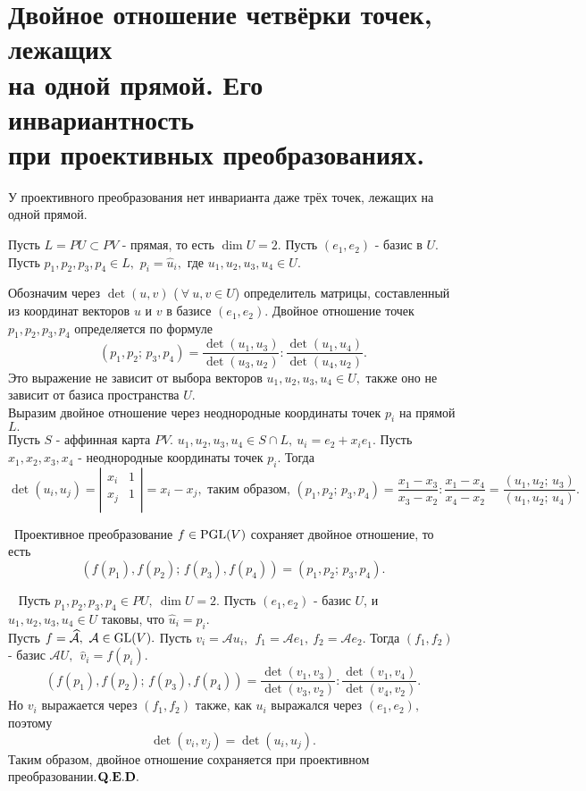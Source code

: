 \documentclass[a4paper]{article}%
\renewcommand{\ab}{\par\noindent}%
\newcommand{\te}{\par\noindent{\bf Теорема.}\ }%
\newcommand{\dok}{\par\noindent{\textsl{Доказательство}.}\ }%
\newcommand{\qed}{\quad${{\bf Q.E.D.}}$}
\renewcommand{\om}[1]{\mathcal{#1}}
\newcommand{\we}[1]{\widehat{#1}}
\begin{document}
\section{Двойное отношение четвёрки точек, лежащих\\ на одной прямой. Его инвариантность\\ при проективных преобразованиях.}
\label{q54}
У проективного преобразования нет инварианта даже трёх точек, лежащих на одной прямой.
\ab Пусть $L=PU\subset PV$ - прямая, то есть\; $\dim U=2.$
Пусть $(e_1,e_2)$ - базис в $U$. Пусть $p_1,p_2,p_3,p_4\in L,$ $p_i=\we{u}_i,$ где $u_1,u_2,u_3,u_4\in U.$
\ab Обозначим через $\det(u,v)$ ($\ \forall \ u,v\in U$) определитель матрицы, составленный из координат векторов
$u$ и $v$ в базисе $(e_1,e_2).$ Двойное отношение точек $p_1,p_2,p_3,p_4$ определяется по формуле
$$
(p_1,p_2;\,p_3,p_4)=\frac{\displaystyle \det(u_1,u_3)}{\displaystyle \det(u_3,u_2)}:\frac{\displaystyle\det(u_1,u_4)}{\displaystyle\det(u_4,u_2)}.
$$
Это выражение не зависит от выбора векторов $u_1,u_2,u_3,u_4\in U,$ также оно не зависит от базиса пространства $U$.
\\Выразим двойное отношение через неоднородные координаты точек $p_i$ на прямой $L.$
\\Пусть $S$ - аффинная карта $PV$. $u_1,u_2,u_3,u_4\in S\cap L,\ u_i=e_2+x_ie_1.$
Пусть $x_1,x_2,x_3,x_4$ - неоднородные координаты точек $p_i$. Тогда
$$
\det(u_i,u_j)=\left|%
\begin{array}{cc}
  x_i & 1 \\
  x_j & 1 \\
\end{array}%
\right|=x_i-x_j,\mbox{ таким образом, }(p_1,p_2;\,p_3,p_4)=\frac{\displaystyle x_1-x_3}{\displaystyle x_3-x_2}:
\frac{\displaystyle x_1-x_4}{\displaystyle x_4-x_2}=\frac{\displaystyle (u_1,u_2;\,u_3)}{\displaystyle (u_1,u_2;\,u_4)}.
$$
\te Проективное преобразование $f\in{\rm PGL}(V)$ сохраняет двойное отношение, то есть $$
\left(f(p_1),f(p_2);\,f(p_3),f(p_4)\right)=(p_1,p_2;\,p_3,p_4).
$$
\dok
Пусть $p_1,p_2,p_3,p_4\in PU,\ \dim U=2.$  Пусть $(e_1,e_2)$ - базис $U$, и $u_1,u_2,u_3,u_4\in U$ таковы, что $\we{u}_i=p_i.$
\\Пусть $f=\om{\we{A}},\ \om{A}\in {\rm GL}(V).$ Пусть $v_i=\om{A}u_i,\ \ f_1=\om{A}e_1,\ f_2=\om{A}e_2.$ Тогда $(f_1,f_2)$ -
базис $\om{A}U,\ \ \we{v}_i=f(p_i).$
$$
\left(f(p_1),f(p_2);\,f(p_3),f(p_4)\right)=\frac{\displaystyle \det(v_1,v_3)}{\displaystyle \det(v_3,v_2)}:\frac{\displaystyle\det(v_1,v_4)}{\displaystyle\det(v_4,v_2)}.
$$
Но $v_i$ выражается через $(f_1,f_2)$ также, как $u_i$ выражался через $(e_1,e_2),$ поэтому
$$\det(v_i,v_j)=\det(u_i,u_j).$$
Таким образом, двойное отношение сохраняется при проективном преобразовании.\qed
\end{document}
